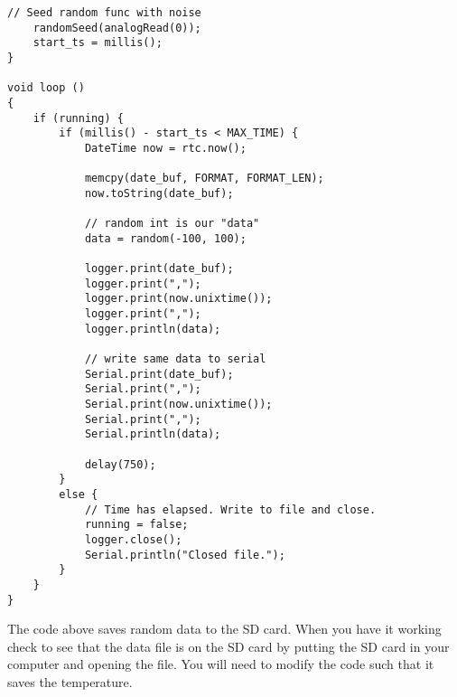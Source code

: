 \begin{lstlisting}[language=Arduino]
	// Seed random func with noise
	randomSeed(analogRead(0)); 
	start_ts = millis();
}

void loop () 
{
	if (running) {
		if (millis() - start_ts < MAX_TIME) {
			DateTime now = rtc.now();
			
			memcpy(date_buf, FORMAT, FORMAT_LEN);
			now.toString(date_buf);
			
			// random int is our "data"
			data = random(-100, 100); 
			
			logger.print(date_buf);
			logger.print(",");
			logger.print(now.unixtime());
			logger.print(",");
			logger.println(data);
			
			// write same data to serial
			Serial.print(date_buf);
			Serial.print(",");
			Serial.print(now.unixtime());
			Serial.print(",");
			Serial.println(data);
			
			delay(750);	    	
		}
		else {
			// Time has elapsed. Write to file and close.
			running = false;
			logger.close();
			Serial.println("Closed file.");
		}
	}
}
\end{lstlisting}


The code above saves random data to the SD card. When you have it working check to see that the data file is on the SD card by putting the SD card in your computer and opening the file.  You will need to modify the code such that it saves the temperature.



